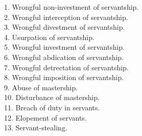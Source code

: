 \documentclass[12pt]{report}
\begin{document}
1. Wrongful non-investment of servantship.\\
2. Wrongful interception of servantship.\\
3. Wrongful divestment of servantship.\\
4. Usurpation of servantship.\\
5. Wrongful investment of servantship.\\
6. Wrongful abdication of servantship.\\
7. Wrongful detrectation of servantship.\\
8. Wrongful imposition of servantship.\\
9. Abuse of mastership.\\
10. Disturbance of mastership.\\
11. Breach of duty in servants.\\
12. Elopement of servants.\\
13. Servant-stealing.
\end{document}

